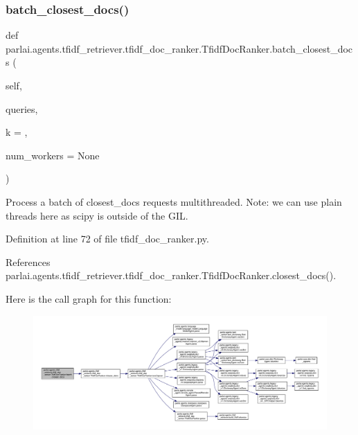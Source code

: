 \subsubsection{\texorpdfstring{batch\+\_\+closest\+\_\+docs()}{batch\_closest\_docs()}}
{\footnotesize\ttfamily def parlai.\+agents.\+tfidf\+\_\+retriever.\+tfidf\+\_\+doc\+\_\+ranker.\+Tfidf\+Doc\+Ranker.\+batch\+\_\+closest\+\_\+docs (\begin{DoxyParamCaption}\item[{}]{self,  }\item[{}]{queries,  }\item[{}]{k = {},  }\item[{}]{num\+\_\+workers = {\ttfamily None} }\end{DoxyParamCaption})}

\begin{DoxyVerb}Process a batch of closest_docs requests multithreaded.
Note: we can use plain threads here as scipy is outside of the GIL.
\end{DoxyVerb}
 

Definition at line 72 of file tfidf\+\_\+doc\+\_\+ranker.\+py.



References parlai.\+agents.\+tfidf\+\_\+retriever.\+tfidf\+\_\+doc\+\_\+ranker.\+Tfidf\+Doc\+Ranker.\+closest\+\_\+docs().

Here is the call graph for this function\+:
\nopagebreak
\begin{figure}[H]
\begin{center}
\leavevmode
\includegraphics[width=350pt]{classparlai_1_1agents_1_1tfidf__retriever_1_1tfidf__doc__ranker_1_1TfidfDocRanker_a3ed4fd5025cc8b1996efc9354ccc8e54_cgraph}
\end{center}
\end{figure}
\mbox{\label{classparlai_1_1agents_1_1tfidf__retriever_1_1tfidf__doc__ranker_1_1TfidfDocRanker_a0573e296758121d2c40563e93acdf366}} 
